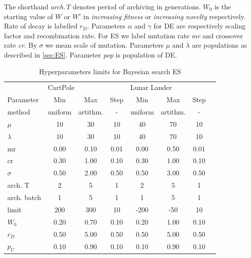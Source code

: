 The shorthand \emph{arch.T} denotes period of archiving in generations. $W_0$ is the starting value of $W$ or $W'$ in \textit{increasing fitness} or \textit{increasing novelty} respectively. Rate of decay is labelled $r_D$. Parameters $\alpha$ and $\gamma$ for DE are respectively scaling factor and recombination rate. For ES we label mutation rate \emph{mr} and crossover rate \emph{cr}. By $\sigma$ we mean scale of mutation. Parameters $\mu$ and $\lambda$ are populations as described in \cref{sec:ES}. Parameter \emph{pop} is population of DE.
 
\begin{table}[ht]
	\centering
	\scriptsize
	\setlength{\tabcolsep}{4pt}
	\renewcommand{\arraystretch}{1.15}
	\begin{tabular}{l||ccc|cccc}
		\toprule
		 & \multicolumn{3}{l}{CartPole} & \multicolumn{3}{l}{Lunar Lander} \\
		Parameter &      Min &  Max & Step &         Min &  Max & Step \\
		\midrule
		method &  uniform & artithm. &    - &     uniform & artithm. &    - \\
		$\mu$ &       10 &   30 &   10 &          40 &   70 &   10 \\
		$\lambda$ &       10 &   30 &   10 &          40 &   70 &   10 \\
		mr &     0.00 & 0.10 & 0.01 &        0.00 & 0.50 & 0.01 \\
		cr &     0.30 & 1.00 & 0.10 &        0.30 & 1.00 & 0.10 \\
		$\sigma$ &     0.50 & 2.00 & 0.50 &        0.50 & 3.00 & 0.50 \\
		arch. T &        2 &    5 &    1 &           2 &    5 &    1 \\
		arch. batch &        1 &    5 &    1 &           1 &    5 &    1 \\
		limit &      200 &  300 &   10 &        -200 &  -50 &   10 \\
		$W_0$ &     0.20 & 0.70 & 0.10 &        0.20 & 1.00 & 0.10 \\
		$r_D$ &     0.50 & 5.00 & 0.50 &        0.50 & 5.00 & 0.50 \\
		$p_U$ &     0.10 & 0.90 & 0.10 &        0.10 & 0.90 & 0.10 \\
		\bottomrule
	\end{tabular}
	\caption{Hyperparameters limits for Bayesian search ES}
	\label{tab:optunaStart1}
\end{table}

